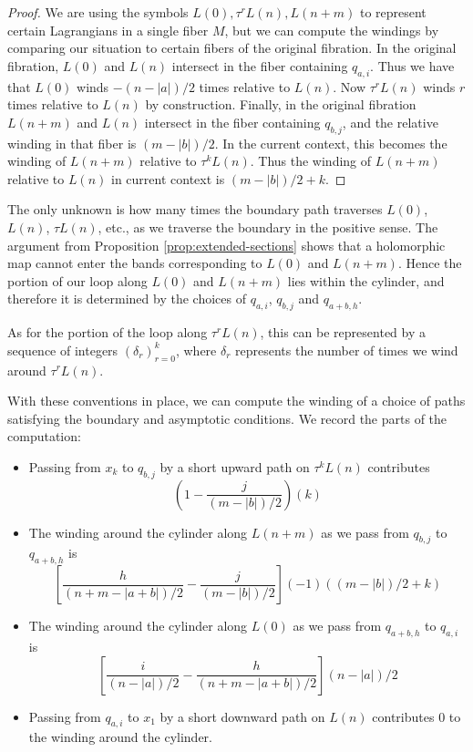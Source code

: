 \documentclass[12pt]{amsart}
\begin{document}
\begin{proof}
We are using the symbols $L(0), \tau^rL(n), L(n+m)$ to represent certain Lagrangians in a single fiber $M$, but we can compute the windings by comparing our situation to certain fibers of the original fibration. In the original fibration, $L(0)$ and $L(n)$ intersect in the fiber containing $q_{a,i}$. Thus we have that $L(0)$ winds $-(n-|a|)/2$ times relative to $L(n)$. Now $\tau^r L(n)$ winds $r$ times relative to $L(n)$ by construction. Finally, in the original fibration $L(n+m)$ and $L(n)$ intersect in the fiber containing $q_{b,j}$, and the relative winding in that fiber is $(m-|b|)/2$. In the current context, this becomes the winding of $L(n+m)$ relative to $\tau^k L(n)$. Thus the winding of $L(n+m)$ relative to $L(n)$ in current context is $(m-|b|)/2 + k$.
\end{proof}

The only unknown is how many times the boundary path traverses $L(0)$,
$L(n)$, $\tau L(n)$, etc., as we traverse the boundary in the positive
sense. The argument from Proposition \ref{prop:extended-sections}
shows that a holomorphic map cannot enter the bands corresponding to
$L(0)$ and $L(n+m)$. Hence the portion of our loop along $L(0)$ and
$L(n+m)$ lies within the cylinder, and therefore it is determined by
the choices of $q_{a,i}$, $q_{b,j}$ and $q_{a+b,h}$.

As for the portion of the loop along $\tau^r L(n)$, this can be
represented by a sequence of integers $(\delta_r)_{r=0}^k$, where
$\delta_r$ represents the number of times we wind around $\tau^r
L(n)$.

With these conventions in place, we can compute the winding of a
choice of paths satisfying the boundary and asymptotic conditions. We
record the parts of the computation:

\begin{itemize}
\item Passing from $x_k$ to $q_{b,j}$ by a short upward path on $\tau^k L(n)$
contributes
\begin{equation}
  \left(1-\frac{j}{(m-|b|)/2}\right)\left(k\right)
\end{equation}

\item The winding around the cylinder along $L(n+m)$ as we pass from
  $q_{b,j}$ to $q_{a+b,h}$ is
\begin{equation}
  \left[\frac{h}{(n+m-|a+b|)/2} - \frac{j}{(m-|b|)/2}\right]
  (-1)((m-|b|)/2 + k)
\end{equation}

\item The winding around the cylinder along $L(0)$ as we pass from
  $q_{a+b,h}$ to $q_{a,i}$ is 
  \begin{equation}
    \left[\frac{i}{(n-|a|)/2} - \frac{h}{(n+m-|a+b|)/2}\right] (n-|a|)/2
  \end{equation}

\item Passing from $q_{a,i}$ to $x_1$ by a short downward path on $L(n)$ contributes $0$
to the winding around the cylinder. 
\end{itemize}
\end{document}
